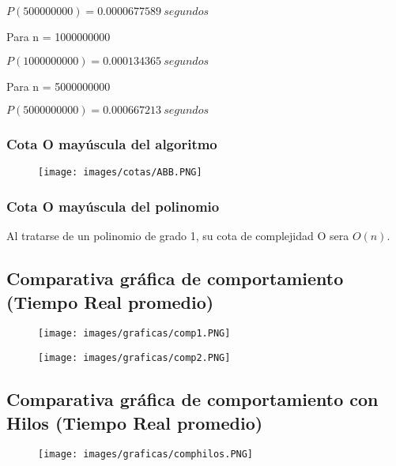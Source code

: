 \documentclass[12pt]{article}
\begin{document}
    			$P(500000000) = 0.0000677589~ segundos$
    			
    			Para n = 1000000000
    			
    			$P(1000000000) = 0.000134365~ segundos$
    			
    			Para n = 5000000000
    			
    			$P(5000000000) = 0.000667213~ segundos$
    		
			\subsubsection{Cota O mayúscula del algoritmo}
			    \begin{figure}[H]
			    	   \centering
			    	   \texttt{[image: images/cotas/ABB.PNG]}
			    \end{figure}
			    
			\subsubsection{Cota O mayúscula del polinomio}
			    Al tratarse de un polinomio de grado 1, su cota de complejidad O sera \textbf{$O(n)$}.
			
		\newpage	
			\subsection{Comparativa gráfica de comportamiento (Tiempo Real promedio)}
			
			\begin{figure}[H]
			    	   \centering
			    	   \texttt{[image: images/graficas/comp1.PNG]}
			    \end{figure}
			    
			    \begin{figure}[H]
			    	   \centering
			    	   \texttt{[image: images/graficas/comp2.PNG]}
			    \end{figure}
			    \newpage
			\subsection{Comparativa gráfica de comportamiento con Hilos (Tiempo Real promedio)}
			
			    \begin{figure}[H]
			    	   \centering
			    	   \texttt{[image: images/graficas/comphilos.PNG]}
			    \end{figure}
			
\end{document}
